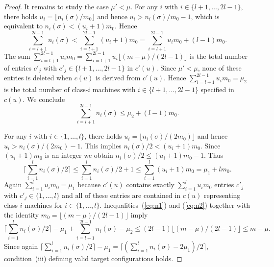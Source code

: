 \documentclass{llncs}
\begin{document}
\begin{proof}
It remains to study the case $\mu' < \mu$. For any $i$ with $i\in \{l+1,\ldots, 2l-1\}$, there holds
$u_i = \lfloor n_i(\sigma)/m_0 \rfloor$ and hence $u_i > n_i(\sigma)/m_0 -1$, which is equivalent to
$n_i(\sigma) < (u_i+1)m_0$. Hence
$$\textstyle \sum_{i=l+1}^{2l-1} n_i(\sigma) < \sum_{i=l+1}^{2l-1} (u_i+1)m_0 = \sum_{i=l+1}^{2l-1} u_im_0 + (l-1)m_0.$$
The sum $\sum_{i=l+1}^{2l-1} u_im_0 = \sum_{i=l+1}^{2l-1} u_i \lfloor (m-\mu)/(2l-1)\rfloor$ is the total
number of entries $c'_j$ with $c'_j\in \{l+1,\ldots, 2l-1\}$ in $c'(u)$. Since $\mu' <\mu$, none of these
entries is deleted when $c(u)$ is derived from $c'(u)$. Hence $\sum_{i=l+1}^{2l-1} u_im_0 =\mu_2$ 
is the total number of class-$i$ machines with $i\in \{l+1,\ldots, 2l-1\}$ specified in $c(u)$. We conclude
\begin{equation}\label{eq:n1}
\textstyle \sum_{i=l+1}^{2l-1} n_i(\sigma) \leq \mu_2 + (l-1)m_0.
\end{equation}

For any $i$ with $i\in \{1,\ldots, l\}$, there holds $u_i = \lfloor n_i(\sigma)/(2m_0) \rfloor$ and hence
$u_i > n_i(\sigma)/(2m_0) -1$. This implies $n_i(\sigma)/2 < (u_i+1)m_0$. Since $(u_i+1)m_0$ is an integer we
obtain $n_i(\sigma)/2 \leq  (u_i+1)m_0 -1$. Thus 
\begin{equation}\label{eq:n2}
\textstyle \lceil \sum_{i=1}^l n_i(\sigma)/2\rceil \leq \sum_{i=1}^l n_i(\sigma)/2 +1 \leq 
\sum_{i=1}^l (u_i+1)m_0 = \mu_1 +lm_0.
\end{equation}
Again $\sum_{i=1}^l u_im_0 = \mu_1$ because $c'(u)$ contains exactly  $\sum_{i=1}^l u_im_0$ entries
$c'_j$ with $c'_j\in \{1,\ldots, l\}$ and all of these entries are contained in $c(u)$ representing class-$i$ 
machines for $i\in \{1,\ldots, l\}$. 
Inequalities~(\ref{eq:n1}) and (\ref{eq:n2}) together with the identity $m_0 = \lfloor (m-\mu)/(2l-1)\rfloor$
imply
$$\textstyle \lceil \sum_{i=1}^l n_i(\sigma)/2\rceil -\mu_1 + \sum_{i=l+1}^{2l-1} n_i(\sigma) - \mu_2 \leq
(2l-1) \lfloor (m-\mu)/(2l-1)\rfloor \leq m-\mu.$$
Since again $\lceil \sum_{i=1}^l n_i(\sigma)/2\rceil -\mu_1 = \lceil (\sum_{i=1}^l n_i(\sigma)-2\mu_1)/2\rceil$,
condition~(iii) defining valid target configurations holds. \hspace*{\fill}{$\Box$}
\end{proof}
\end{document}
